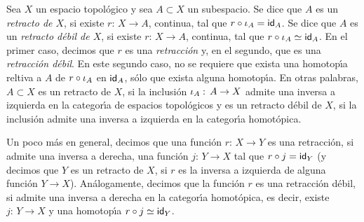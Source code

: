\theoremstyle{plain}
\newtheorem{teoExtensionDeHomotopiasRetractoEquivaleARetractoDebil}{Teorema}%
	[section]

\theoremstyle{remark}
\newtheorem{obsExtensionDeHomotopias}%
	[teoExtensionDeHomotopiasRetractoEquivaleARetractoDebil]%
	{Observaci\'{o}n}


Sea $X$ un espacio topol\'{o}gico y sea $A\subset X$ un subespacio. Se dice
que $A$ es un \emph{retracto de $X$}, si existe $r:\,X\rightarrow A$, continua,
tal que $r\circ\inc[A]=\id[A]$. Se dice que $A$ es un \emph{retracto %
d\'{e}bil de $X$}, si existe $r:\,X\rightarrow A$, continua, tal que
$r\circ\inc[A]\simeq\id[A]$. En el primer caso, decimos que $r$ es una
\emph{retracci\'{o}n} y, en el segundo, que es una \emph{retracci\'{o}n %
d\'{e}bil}. En este segundo caso, no se requiere que exista una homotop\'{\i}a
reltiva a $A$ de $r\circ\inc[A]$ en $\id[A]$, s\'{o}lo que exista alguna
homotop\'{\i}a. En otras palabras, $A\subset X$ es un retracto de $X$, si la
inclusi\'{o}n $\inc[A]:\,A\rightarrow X$ admite una inversa a izquierda en la
categor\'{\i}a de espacios topol\'{o}gicos y es un retracto d\'{e}bil de $X$,
si la inclusi\'{o}n admite una inversa a izquierda en la categor\'{\i}a
homot\'{o}pica.

Un poco m\'{a}s en general, decimos que una funci\'{o}n $r:\,X\rightarrow Y$
es una retracci\'{o}n, si admite una inversa a derecha, una funci\'{o}n
$j:\,Y\rightarrow X$ tal que $r\circ j=\id[Y]$ (y decimos que $Y$ es un
retracto de $X$, si $r$ es la inversa a izquierda de alguna funci\'{o}n
$Y\rightarrow X$). An\'{a}logamente, decimos que la funci\'{o}n $r$ es una
retracci\'{o}n d\'{e}bil, si admite una inversa a derecha en la categor\'{\i}a
homot\'{o}pica, es decir, existe $j:\,Y\rightarrow X$ y una homotop\'{\i}a
$r\circ j\simeq\id[Y]$.

